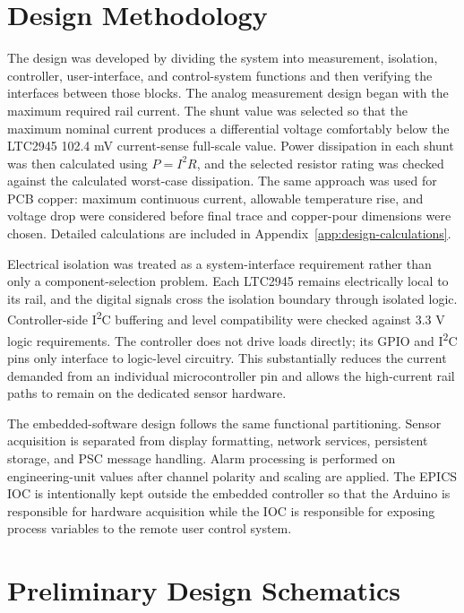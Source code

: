 \section{Design Methodology}
The design was developed by dividing the system into measurement, isolation,
controller, user-interface, and control-system functions and then verifying the
interfaces between those blocks. The analog measurement design began with the
maximum required rail current. The shunt value was selected so that the maximum
nominal current produces a differential voltage comfortably below the LTC2945
102.4 mV current-sense full-scale value. Power dissipation in each shunt was
then calculated using \(P=I^2R\), and the selected resistor rating was checked
against the calculated worst-case dissipation. The same approach was used for
PCB copper: maximum continuous current, allowable temperature rise, and voltage
drop were considered before final trace and copper-pour dimensions were chosen.
Detailed calculations are included in Appendix~\ref{app:design-calculations}.

Electrical isolation was treated as a system-interface requirement rather than
only a component-selection problem. Each LTC2945 remains electrically local to
its rail, and the digital signals cross the isolation boundary through isolated
logic. Controller-side I\textsuperscript{2}C buffering and level compatibility
were checked against 3.3 V logic requirements. The controller does not drive
loads directly; its GPIO and I\textsuperscript{2}C pins only interface to
logic-level circuitry. This substantially reduces the current demanded from an
individual microcontroller pin and allows the high-current rail paths to remain
on the dedicated sensor hardware.

The embedded-software design follows the same functional partitioning. Sensor
acquisition is separated from display formatting, network services, persistent
storage, and PSC message handling. Alarm processing is performed on engineering-unit values after
channel polarity and scaling are applied. The EPICS IOC is intentionally kept
outside the embedded controller so that the Arduino is responsible for hardware
acquisition while the IOC is responsible for exposing process variables to the remote user control system.

\section{Preliminary Design Schematics}
\label{sec:prelim-schematics}

